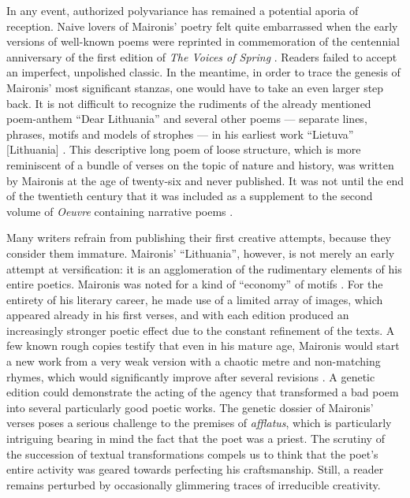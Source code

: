 \begin{paper}
In any event, authorized polyvariance has remained a potential aporia of
reception. Naive lovers of Maironis' poetry felt quite embarrassed when the early versions of well-known poems were
reprinted in commemoration of the centennial anniversary of the first edition of
\emph{The Voices of Spring} \citep{maironis_pavasario_1995}. Readers failed to
accept an imperfect, unpolished classic. In the meantime, in order to
trace the genesis of Maironis' most significant stanzas, one would have
to take an even larger step back. It is not difficult to recognize the
rudiments of the already mentioned poem-anthem ``Dear Lithuania'' and
several other poems --- separate lines, phrases, motifs and models of
strophes --- in his earliest work ``Lietuva'' [Lithuania] \citep{maironis_lietuva_1888}. This descriptive long poem of loose structure, which is more
reminiscent of a bundle of verses on the topic of nature and history,
was written by Maironis at the age of twenty-six and never published. It
was not until the end of the twentieth century that it was included as a
supplement to the second volume of \emph{Oeuvre} containing narrative
poems \citep{maironis_rastai_1988}.

Many writers refrain from publishing their first creative attempts, because they consider
them immature. Maironis' ``Lithuania'', however, is not merely an early
attempt at versification: it is an agglomeration of the rudimentary
elements of his entire poetics. Maironis was noted for a kind of
``economy'' of motifs \citep[81]{speicyte_anapus_2012}. For the entirety of his literary career, he made
use of a limited array of images, which appeared already in his first
verses, and with each edition produced an increasingly stronger poetic
effect due to the constant refinement of the texts. A few known rough
copies testify that even in his mature age, Maironis would start a new
work from a very weak version with a chaotic metre and non-matching
rhymes, which would significantly improve after several revisions
\citep{maironis_punes_1925}. A genetic edition could demonstrate the acting of the
agency that transformed a bad poem into several particularly good poetic works. The genetic dossier of Maironis' verses poses a serious
challenge to the premises of \emph{afflatus}, which is particularly
intriguing bearing in mind the fact that the poet was a priest. The
scrutiny of the succession of textual transformations compels us to
think that the poet's entire activity was geared towards perfecting his craftsmanship.
Still, a reader remains perturbed by occasionally glimmering traces of
irreducible creativity.


\end{paper}
